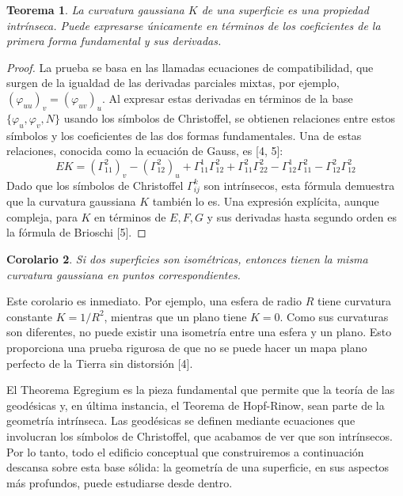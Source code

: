 \documentclass[12pt, a4paper]{report}
\theoremstyle{miestilo}
\newtheorem{teorema}{Teorema}[chapter]
\newtheorem{corolario}[teorema]{Corolario}
\theoremstyle{midefinicion}
\begin{document}
\begin{teorema}
La curvatura gaussiana $K$ de una superficie es una propiedad intrínseca. Puede expresarse únicamente en términos de los coeficientes de la primera forma fundamental y sus derivadas.
\end{teorema}

\begin{proof}
La prueba se basa en las llamadas ecuaciones de compatibilidad, que surgen de la igualdad de las derivadas parciales mixtas, por ejemplo, $(\varphi_{uu})_v = (\varphi_{uv})_u$. Al expresar estas derivadas en términos de la base $\{\varphi_u, \varphi_v, N\}$ usando los símbolos de Christoffel, se obtienen relaciones entre estos símbolos y los coeficientes de las dos formas fundamentales. Una de estas relaciones, conocida como la ecuación de Gauss, es [4, 5]:
$$ E K = (\Gamma_{11}^2)_v - (\Gamma_{12}^2)_u + \Gamma_{11}^1 \Gamma_{12}^2 + \Gamma_{11}^2 \Gamma_{22}^2 - \Gamma_{12}^1 \Gamma_{11}^2 - \Gamma_{12}^2 \Gamma_{12}^2 $$
Dado que los símbolos de Christoffel $\Gamma_{ij}^k$ son intrínsecos, esta fórmula demuestra que la curvatura gaussiana $K$ también lo es. Una expresión explícita, aunque compleja, para $K$ en términos de $E, F, G$ y sus derivadas hasta segundo orden es la fórmula de Brioschi [5].
\end{proof}

\begin{corolario}
Si dos superficies son isométricas, entonces tienen la misma curvatura gaussiana en puntos correspondientes.
\end{corolario}

Este corolario es inmediato. Por ejemplo, una esfera de radio $R$ tiene curvatura constante $K = 1/R^2$, mientras que un plano tiene $K=0$. Como sus curvaturas son diferentes, no puede existir una isometría entre una esfera y un plano. Esto proporciona una prueba rigurosa de que no se puede hacer un mapa plano perfecto de la Tierra sin distorsión [4].

El Theorema Egregium es la pieza fundamental que permite que la teoría de las geodésicas y, en última instancia, el Teorema de Hopf-Rinow, sean parte de la geometría intrínseca. Las geodésicas se definen mediante ecuaciones que involucran los símbolos de Christoffel, que acabamos de ver que son intrínsecos. Por lo tanto, todo el edificio conceptual que construiremos a continuación descansa sobre esta base sólida: la geometría de una superficie, en sus aspectos más profundos, puede estudiarse desde dentro.
\end{document}
